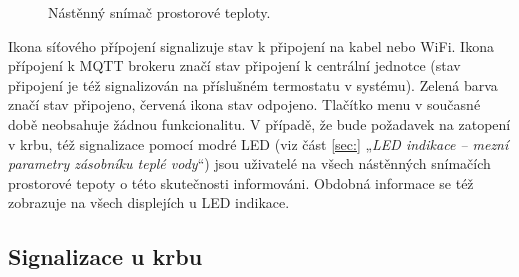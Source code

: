 \begin{Czech}
\begin{figure}[H]
\caption{Nástěnný snímač prostorové teploty.}
\label{fig:wall-mounted-room-temperature-sensor-with-case}
\end{figure}
\end{Czech}

\begin{Czech}
Ikona síťového přípojení signalizuje stav k připojení na kabel nebo WiFi. Ikona přípojení k MQTT brokeru značí stav připojení k centrální jednotce (stav připojení je též signalizován na příslušném termostatu v systému). Zelená barva značí stav připojeno, červená ikona stav odpojeno. Tlačítko menu v současné době neobsahuje žádnou funkcionalitu. V  případě, že bude požadavek na zatopení v krbu, též signalizace pomocí modré LED (viz část \ref{sec:} „\textit{LED indikace – mezní parametry zásobníku teplé vody}“) jsou uživatelé na všech nástěnných snímačích prostorové tepoty o této skutečnosti informováni. Obdobná informace se též zobrazuje na všech displejích u LED indikace.
\end{Czech}


\begin{Czech}
\subsection{Signalizace u krbu}
\end{Czech}


